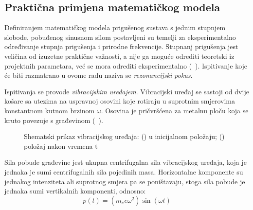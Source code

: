 \subsection{Praktična primjena matematičkog modela}
Definiranjem matematičkog modela prigušenog sustava s jednim stupnjem slobode,
pobuđenog sinusnom silom postavljeni su temelji za eksperimentalno određivanje
stupnja prigušenja i prirodne frekvencije. Stupnanj prigušenja jest veličina od
izuzetne praktične važnosti, a nije ga moguće odrediti teoretski iz projektnih
parametara, već se mora odrediti eksperimentalno (~\cite{dk_skripta}). %
Ispitivanje koje će biti razmatrano u ovome radu naziva se \textit{rezonancijski
pokus}.


Ispitivanja se provode \textit{vibracijskim uređajem}. Vibracijski uređaj se sastoji
od dvije košare sa utezima na uspravnoj osovini koje rotiraju u suprotnim smjerovima
konstantnom kutnom brzinom $\omega$. Osovina je pričvršćena za metalnu ploču koja se
kruto povezuje s građevinom (~\cite{dk_skripta}). 

\begin{figure}[H]
        \begin{subfigure}[b][][l]{0.45\textwidth}
        
        \caption{}
        \label{fig:vibracijski-t0}
    \end{subfigure}
    \hfill
    \begin{subfigure}[b][][r]{0.45\textwidth}
        
        \caption{}
        \label{fig:vibracijski-t}
    \end{subfigure}
    \caption{Shematski prikaz vibracijskog uređaja: 
            () u inicijalnom položaju;
            () položaj nakon vremena t}
    \label{fig:vibracijski}
\end{figure}

Sila pobude građevine jest ukupna centrifugalna sila vibracijskog uređaja, koja je 
jednaka je sumi centrifugalnih sila pojedinih masa.
Horizontalne komponente su jednakog intenziteta ali suprotnog smjera pa se
poništavaju, stoga sila pobude je jednaka sumi vertikalnih komponenti, odnosno:
\begin{equation}
    p(t)=(m_ee\omega^2)\sin(\omega t)
\end{equation}

